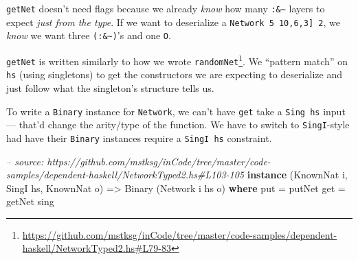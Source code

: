 \documentclass[]{article}
\newenvironment{Shaded}{}{}
\newcommand{\KeywordTok}[1]{\textcolor[rgb]{0.00,0.44,0.13}{\textbf{{#1}}}}
\newcommand{\DataTypeTok}[1]{\textcolor[rgb]{0.56,0.13,0.00}{{#1}}}
\newcommand{\CommentTok}[1]{\textcolor[rgb]{0.38,0.63,0.69}{\textit{{#1}}}}
\newcommand{\OtherTok}[1]{\textcolor[rgb]{0.00,0.44,0.13}{{#1}}}
\newcommand{\FunctionTok}[1]{\textcolor[rgb]{0.02,0.16,0.49}{{#1}}}
\newcommand{\NormalTok}[1]{{#1}}
\renewcommand{\href}[2]{#2\footnote{\url{#1}}}
\begin{document}
\begin{Shaded}
\end{Shaded}

\texttt{getNet} doesn't need flags because we already \emph{know} how many
\texttt{:\&\textasciitilde{}} layers to expect \emph{just from the type}. If we
want to deserialize a \texttt{Network\ 5\ \textquotesingle{}{[}10,6,3{]}\ 2}, we
\emph{know} we want three \texttt{(:\&\textasciitilde{})}'s and one \texttt{O}.

\texttt{getNet} is written similarly to how we wrote
\href{https://github.com/mstksg/inCode/tree/master/code-samples/dependent-haskell/NetworkTyped2.hs\#L79-83}{\texttt{randomNet\textquotesingle{}}}.
We ``pattern match'' on \texttt{hs} (using singletons) to get the constructors
we are expecting to deserialize and just follow what the singleton's structure
tells us.

To write a \texttt{Binary} instance for \texttt{Network}, we can't have
\texttt{get} take a \texttt{Sing\ hs} input --- that'd change the arity/type of
the function. We have to switch to \texttt{SingI}-style had have their
\texttt{Binary} instances require a \texttt{SingI\ hs} constraint.

\begin{Shaded}
\begin{Highlighting}[]
\CommentTok{-- source: https://github.com/mstksg/inCode/tree/master/code-samples/dependent-haskell/NetworkTyped2.hs#L103-105}
\KeywordTok{instance} \NormalTok{(}\DataTypeTok{KnownNat} \NormalTok{i, }\DataTypeTok{SingI} \NormalTok{hs, }\DataTypeTok{KnownNat} \NormalTok{o) }\OtherTok{=>} \DataTypeTok{Binary} \NormalTok{(}\DataTypeTok{Network} \NormalTok{i hs o) }\KeywordTok{where}
    \NormalTok{put }\FunctionTok{=} \NormalTok{putNet}
    \NormalTok{get }\FunctionTok{=} \NormalTok{getNet sing}
\end{Highlighting}
\end{Shaded}
\end{document}
